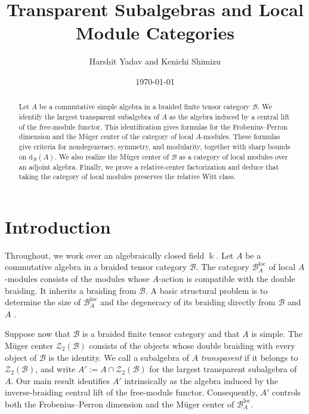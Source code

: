 \documentclass[11pt,reqno]{amsart}
\title[Transparent subalgebras and local modules]{Transparent Subalgebras and Local Module Categories}
\author{Harshit Yadav and Kenichi Shimizu}
\date{\today}
\numberwithin{equation}{section}
\theoremstyle{plain}
\theoremstyle{definition}
\theoremstyle{remark}
\newcommand{\kk}{\Bbbk}
\newcommand{\B}{\mathcal{B}}
\newcommand{\Z}{\mathcal{Z}}
\newcommand{\loc}{\mathrm{loc}}
\newcommand{\FP}{\mathrm{d}}
\begin{document}
\begin{abstract}
Let $A$ be a commutative simple algebra in a braided finite tensor category
$\B$. We identify the largest transparent subalgebra of $A$ as the algebra 
induced by a central lift of the free-module functor.
This identification gives formulas for the Frobenius--Perron dimension and
the M\"uger center of the category of local $A$-modules. These formulas give
criteria for nondegeneracy, symmetry, and modularity, together with sharp
bounds on $\FP_{\B}(A)$. We also realize the M\"uger center of $\B$ as a
category of local modules over an adjoint algebra. Finally, we prove a
relative-center factorization and deduce that taking the category of local 
modules preserves the relative Witt class.
\end{abstract}

\maketitle



\section{Introduction}

Throughout, we work over an algebraically closed field $\kk$. 
Let $A$ be a commutative algebra in a braided tensor category $\B$. The
category $\B_A^{\loc}$ of local $A$-modules consists of the modules whose
$A$-action is compatible with the double braiding. It inherits a braiding
from $\B$. A basic structural problem is to determine the size of
$\B_A^{\loc}$ and the degeneracy of its braiding directly from $\B$ and $A$ 
\cite{pareigis1995braiding,kirillov2002q,davydov2013witt,laugwitz2022constructing,shimizu2026commutative}.

Suppose now that $\B$ is a braided finite tensor category and that $A$ is
simple.
The M\"uger center $\Z_2(\B)$ consists of the objects whose double braiding
with every object of $\B$ is the identity. We call a subalgebra of $A$
\emph{transparent} if it belongs to $\Z_2(\B)$, and write
$A':=A\cap\Z_2(\B)$ for the largest transparent subalgebra of $A$. Our main
result identifies $A'$ intrinsically as the algebra induced by the
inverse-braiding central lift of the free-module functor. Consequently, $A'$ controls both the Frobenius--Perron dimension and the M\"uger
center of $\B_A^{\loc}$.
\end{document}
